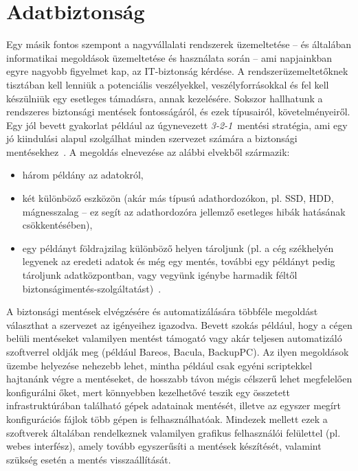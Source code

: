 \section{Adatbiztonság}
Egy másik fontos szempont a nagyvállalati rendszerek üzemeltetése -- és általában informatikai megoldások üzemeltetése és használata során -- ami napjainkban egyre nagyobb figyelmet kap, az IT-biztonság kérdése. A rendszerüzemeltetőknek tisztában kell lenniük a potenciális veszélyekkel, veszélyforrásokkal és fel kell készülniük egy esetleges támadásra, annak kezelésére. Sokszor hallhatunk a rendszeres biztonsági mentések fontosságáról, és ezek típusairól, követelményeiről. Egy jól bevett gyakorlat például az úgynevezett \textit{\mbox{3-2-1}}~mentési stratégia, ami egy jó kiindulási alapul szolgálhat minden szervezet számára a biztonsági mentésekhez~\cite{Backblaze321}.
A megoldás elnevezése az alábbi elvekből származik:
\begin{itemize}
	\item három példány az adatokról,
	\item két különböző eszközön (akár más típusú adathordozókon, pl. SSD, HDD, mágnesszalag -- ez segít az adathordozóra jellemző esetleges hibák hatásának csökkentésében),
	\item egy példányt földrajzilag különböző helyen tároljunk (pl. a cég székhelyén legyenek az eredeti adatok és még egy mentés, további egy példányt pedig tároljunk adatközpontban, vagy vegyünk igénybe harmadik féltől biztonságimentés-szolgáltatást)~\cite{Seagate321}.
\end{itemize}

A biztonsági mentések elvégzésére és automatizálására többféle megoldást választhat a szervezet az igényeihez igazodva. Bevett szokás például, hogy a cégen belüli mentéseket valamilyen mentést támogató vagy akár teljesen automatizáló szoftverrel oldják meg (például Bareos, Bacula, BackupPC). Az ilyen megoldások üzembe helyezése nehezebb lehet, mintha például csak egyéni scriptekkel hajtanánk végre a mentéseket, de hosszabb távon mégis célszerű lehet megfelelően konfigurálni őket, mert könnyebben kezelhetővé teszik egy összetett infrastruktúrában található gépek adatainak mentését, illetve az egyszer megírt konfigurációs fájlok több gépen is felhasználhatóak. Mindezek mellett ezek a szoftverek általában rendelkeznek valamilyen grafikus felhasználói felülettel (pl. webes interfész), amely tovább egyszerűsíti a mentések készítését, valamint szükség esetén a mentés visszaállítását.


